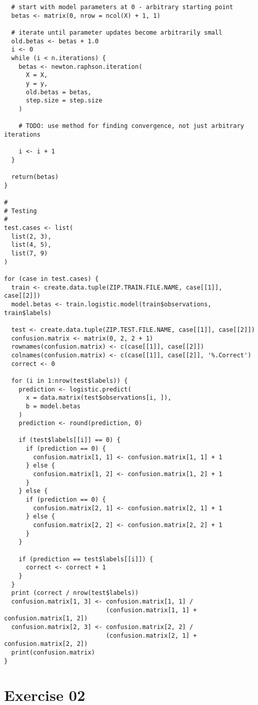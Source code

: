 \documentclass{article}
\begin{document}
\begin{verbatim}
  # start with model parameters at 0 - arbitrary starting point
  betas <- matrix(0, nrow = ncol(X) + 1, 1)

  # iterate until parameter updates become arbitrarily small
  old.betas <- betas + 1.0
  i <- 0
  while (i < n.iterations) {
    betas <- newton.raphson.iteration(
      X = X,
      y = y,
      old.betas = betas,
      step.size = step.size
    )

    # TODO: use method for finding convergence, not just arbitrary iterations

    i <- i + 1
  }

  return(betas)
}

#
# Testing
#
test.cases <- list(
  list(2, 3),
  list(4, 5),
  list(7, 9)
)

for (case in test.cases) {
  train <- create.data.tuple(ZIP.TRAIN.FILE.NAME, case[[1]], case[[2]])
  model.betas <- train.logistic.model(train$observations, train$labels)

  test <- create.data.tuple(ZIP.TEST.FILE.NAME, case[[1]], case[[2]])
  confusion.matrix <- matrix(0, 2, 2 + 1)
  rownames(confusion.matrix) <- c(case[[1]], case[[2]])
  colnames(confusion.matrix) <- c(case[[1]], case[[2]], '%.Correct')
  correct <- 0

  for (i in 1:nrow(test$labels)) {
    prediction <- logistic.predict(
      x = data.matrix(test$observations[i, ]),
      b = model.betas
    )
    prediction <- round(prediction, 0)

    if (test$labels[[i]] == 0) {
      if (prediction == 0) {
        confusion.matrix[1, 1] <- confusion.matrix[1, 1] + 1
      } else {
        confusion.matrix[1, 2] <- confusion.matrix[1, 2] + 1
      }
    } else {
      if (prediction == 0) {
        confusion.matrix[2, 1] <- confusion.matrix[2, 1] + 1
      } else {
        confusion.matrix[2, 2] <- confusion.matrix[2, 2] + 1
      }
    }

    if (prediction == test$labels[[i]]) {
      correct <- correct + 1
    }
  }
  print (correct / nrow(test$labels))
  confusion.matrix[1, 3] <- confusion.matrix[1, 1] /
                            (confusion.matrix[1, 1] + confusion.matrix[1, 2])
  confusion.matrix[2, 3] <- confusion.matrix[2, 2] /
                            (confusion.matrix[2, 1] + confusion.matrix[2, 2])
  print(confusion.matrix)
}
\end{verbatim}

%
\newpage
\section{Exercise 02}
\end{document}

